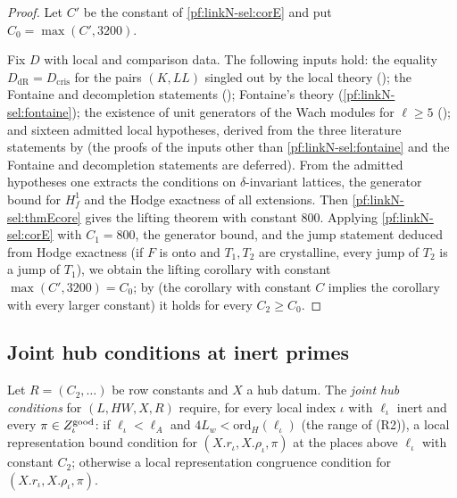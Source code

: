 \begin{proof}
Let $C'$ be the constant of \cref{pf:linkN-sel:corE} and put $C_0=\max(C',3200)$.

Fix $D$ with local and comparison data. The following inputs hold: the equality $D_{\mathrm{dR}}=D_{\mathrm{cris}}$ for the pairs $(K,\mathit{LL})$
singled out by the local theory (); the Fontaine and decompletion statements
(); Fontaine's theory (\cref{pf:linkN-sel:fontaine}); the existence of unit generators of the Wach modules for $\ell\ge5$
(); and sixteen admitted local hypotheses, derived from the three literature statements by
 (the proofs of the inputs other than \cref{pf:linkN-sel:fontaine} and the Fontaine and decompletion statements are deferred). From the admitted
hypotheses one extracts the conditions on $\delta$-invariant lattices, the generator bound for $H^1_f$ and the Hodge exactness of all
extensions. Then \cref{pf:linkN-sel:thmEcore} gives the lifting theorem with constant $800$.
Applying \cref{pf:linkN-sel:corE} with $C_1=800$, the generator bound, and the jump statement
deduced from Hodge exactness (if $F$ is onto and $T_1,T_2$ are crystalline, every jump of $T_2$ is a jump of $T_1$), we obtain the lifting corollary
with constant $\max(C',3200)=C_0$; by  (the
corollary with constant $C$ implies the corollary with every larger constant) it holds for every $C_2\ge C_0$.
\end{proof}

\subsection{Joint hub conditions at inert primes}\label{sec:pf:linkN-sel:bcd}

\begin{definition}\label{pf:linkN-sel:jointdef}
Let $R=(C_2,\dots)$ be row constants and $X$ a hub datum. The \emph{joint hub conditions} for $(L,HW,X,R)$ require, for every local index $\iota$ with
$\ell_\iota$ inert and every $\pi\in Z^{\mathrm{good}}_\iota$: if $\ell_\iota<\ell_A$ and $4L_w<\mathrm{ord}_H(\ell_\iota)$ (the range of (R2)), a local
representation bound condition for $(X.r_\iota,X.\rho_\iota,\pi)$ at the places above $\ell_\iota$ with constant $C_2$; otherwise a local representation
congruence condition for $(X.r_\iota,X.\rho_\iota,\pi)$.
\end{definition}

